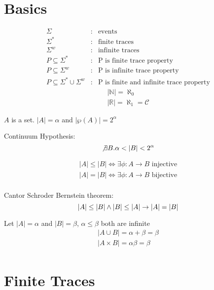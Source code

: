 \documentclass{report}
\begin{document}
\section{Basics}

\[
\begin{array}{rcl}
	                            \Sigma & : & \text{events}                                  \\
	                          \Sigma^* & : & \text{finite traces}                           \\
	                          \Sigma^w & : & \text{infinite traces}                         \\
	              P \subseteq \Sigma^* & : & \text{P is finite trace property}              \\
	              P \subseteq \Sigma^w & : & \text{P is infinite trace property}            \\
	P \subseteq \Sigma^* \cup \Sigma^w & : & \text{P is finite and infinite trace property}
\end{array}
\]
\[
\begin{array}{l}
	|\mathbb{N}| = \aleph_0               \\
	|\mathbb{R}| = \aleph_1 = \mathcal{C}
\end{array}
\]

$A$  is a set. $|A| = \alpha$ and
$|\wp(A)| = 2^\alpha$

\medskip

Continuum Hypothesis:
$$\not\exists B. \alpha < |B| < 2^\alpha$$

\[
\begin{array}{l}
|A| \leq |B| \iff \exists \phi : A \to B \text{ injective}\\
|A| = |B| \iff \exists \phi : A \to B \text{ bijective}\\
\end{array}
\]

Cantor Schroder Bernstein theorem:
\[
|A| \leq |B| \land |B| \leq |A| \to |A| = |B|\\
\]

Let $|A|= \alpha$ and $|B| = \beta$,
$\alpha \leq \beta$ both are infinite
\[
\begin{array}{l}
|A \cup B| = \alpha + \beta = \beta\\
|A \times B| = \alpha\beta = \beta\\
\end{array}
\]

\section{Finite Traces}
\end{document}
